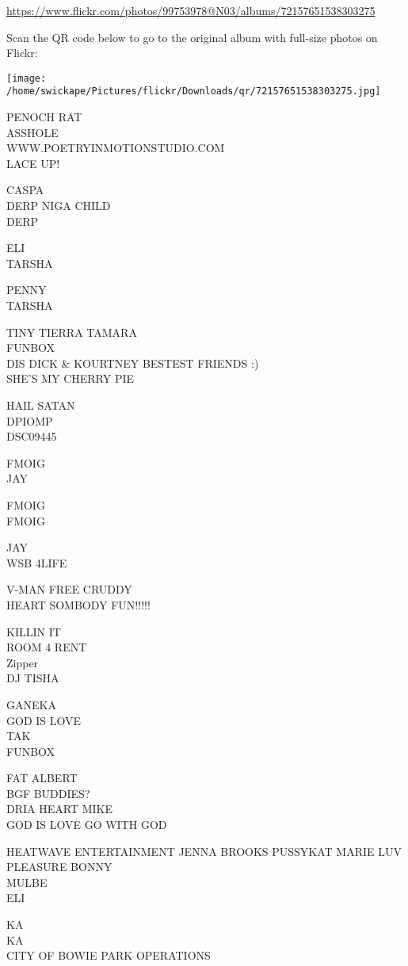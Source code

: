 \documentclass[10pt,letterpaper]{article}
\begin{document}
\url{https://www.flickr.com/photos/99753978@N03/albums/72157651538303275}

Scan the QR code below to go to the original album with full-size photos on Flickr:

\texttt{[image: /home/swickape/Pictures/flickr/Downloads/qr/72157651538303275.jpg]}


PENOCH RAT\\
ASSHOLE\\
WWW.POETRYINMOTIONSTUDIO.COM\\
LACE UP!

CASPA\\
DERP NIGA CHILD\\
DERP

ELI\\
TARSHA

PENNY\\
TARSHA

TINY TIERRA TAMARA\\
FUNBOX\\
DIS DICK \& KOURTNEY BESTEST FRIENDS :)\\
SHE'S MY CHERRY PIE

HAIL SATAN\\
DPIOMP\\
DSC09445

FMOIG\\
JAY

FMOIG\\
FMOIG

JAY\\
WSB 4LIFE

V{-}MAN FREE CRUDDY\\
HEART SOMBODY FUN!!!!!

KILLIN IT\\
ROOM 4 RENT\\
Zipper\\
DJ TISHA

GANEKA\\
GOD IS LOVE\\
TAK\\
FUNBOX

FAT ALBERT\\
BGF BUDDIES?\\
DRIA HEART MIKE\\
GOD IS LOVE GO WITH GOD

HEATWAVE ENTERTAINMENT JENNA BROOKS PUSSYKAT MARIE LUV PLEASURE BONNY\\
MULBE\\
ELI

KA\\
KA\\
CITY OF BOWIE PARK OPERATIONS
\end{document}
